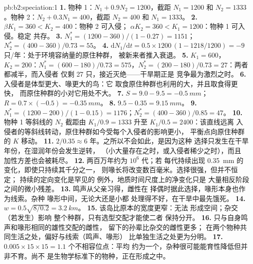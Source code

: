 \begin{solution}{pb:b2:speciation:1}
\textbf{1.} 物种 1：$N_1 + 0.9N_2 = 1200$，截距 $N_1 = 1200$
和 $N_2 = 1333$。物种 2：$N_2 + 0.3N_1 = 400$，截距 $N_2 =
400$ 和 $N_1 = 1333$。
\textbf{2.} $\beta K_1 = 360 < K_2 = 400$：物种 2 可入侵；
$\alpha K_2 = 360 < K_1 = 1200$：物种 1 可入侵。稳定
共存。
\textbf{3.} $N_1^{*} = (1200 - 360)/(1 - 0.27) = 1151$；$N_2^{*} =
(400 - 360)/0.73 = 55$。
\textbf{4.} $\mathrm{d}N_1/\mathrm{d}t = 0.5\times 1200\,(1 - 1218/1200)
= -9$ 只/年：处于环境容纳量的原住种群，
被新来者推入衰退。
\textbf{5.} $K_1 = 600$，$K_2 = 200$：$N_1^{*} = (600 - 180)/0.73 =
575$，$N_2^{*} = (200 - 180)/0.73 = 27$：两者都减半，而入侵者
仅剩 27 只，接近灭绝——干旱期正是
竞争最为激烈之时。
\textbf{6.} 入侵者是体型更大、喙更大的鸟：它
取食原住种群也利用的大，并且取食得更快，
而原住种群的小对它用处不大。
\textbf{7.} $S = 9.0 - 9.5 = \qty{-0.5}{mm}$；$R = 0.7\times(-0.5) =
\qty{-0.35}{mm}$。
\textbf{8.} $9.5 - 0.35 = \qty{9.15}{mm}$。
\textbf{9.} $N_1^{*} = (1200 - 200)/(1 - 0.15) = 1176$；$N_2^{*} =
(400 - 360)/0.85 = 47$。
\textbf{10.} 物种 1 等斜线的 $N_2$ 截距由
$K_1/0.9 = 1333$ 升至 $K_1/0.5 = 2400$：该直线远离
入侵者的等斜线转动，原住种群如今受每个入侵者的影响更小，
平衡点向原住种群的 $K$ 移动。
\textbf{11.} $2/0.35 \approx 6$ 年。之所以不会如此，是因为这种
选择只发生在干旱年份，在湿润年份会发生逆转，
（小大量存在之时，或入侵者稀少之时），而且
加性方差也会被耗尽。
\textbf{12.} 两百万年约为 $10^{6}$ 代；若
每代持续出现 \qty{0.35}{mm} 的变化，即使只持续其千分之一，
则喙长将改变数百毫米。选择很强，但并不恒定；
持续的定向变化是罕见的
例外，地质时间尺度上的净变化只是
大量相反阶段之间的微小残差。
\textbf{13.} 鸣声从父亲习得，雌性在
择偶时据此选择，喙形本身也作为线索。杂种
喙形中间，无论大还是小都
处理得不好，在干旱中最先饿死。
\textbf{14.} $w = 0.5\sqrt{8/0.2} = \qty{3.2}{km}$。
\textbf{15.} 该岛比原本的宽度更窄：无法
形成空间；杂交（若发生）影响
整个种群，只有选型交配才能使二者
保持分开。
\textbf{16.} 只与自身鸣声和喙形相同的雄性交配的雌性，
留下的孙辈比杂交的雌性更多；
在两个物种共同生活之处，偏好与线索（鸣声、喙形）
比单独生活之处更为分明。
\textbf{17.} $0.005\times 15\times 15 = 1.1$ 个不相容位点：平均
约为一个，杂种很可能能育性降低但并非不育。尚不
是生物学标准下的物种，正在形成之中。

\end{solution}
